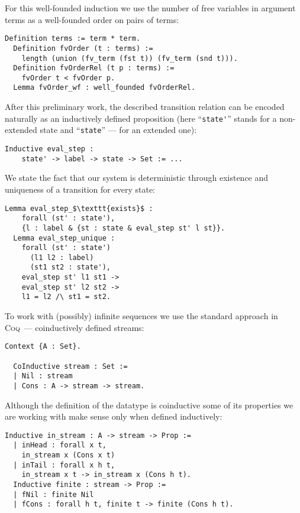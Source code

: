 For this well-founded induction we use the number of free variables in argument terms as a well-founded order on pairs of terms:

\begin{lstlisting}[language=Coq]
  Definition terms := term * term.
  Definition fvOrder (t : terms) :=
    length (union (fv_term (fst t)) (fv_term (snd t))).
  Definition fvOrderRel (t p : terms) :=
    fvOrder t < fvOrder p.
  Lemma fvOrder_wf : well_founded fvOrderRel.
\end{lstlisting}

After this preliminary work, the described transition relation can be encoded naturally as an inductively defined proposition (here ``\lstinline|state'|''
stands for a non-extended state and ``\lstinline|state|'' --- for an extended one):

\begin{lstlisting}[language=Coq]
  Inductive eval_step :
    state' -> label -> state -> Set := ...
\end{lstlisting}

We state the fact that our system is deterministic through existence and uniqueness of a transition for every state:

\begin{lstlisting}[language=Coq]
  Lemma eval_step_$\texttt{exists}$ :
    forall (st' : state'),
    {l : label & {st : state & eval_step st' l st}}.
  Lemma eval_step_unique :
    forall (st' : state')
      (l1 l2 : label)
      (st1 st2 : state'),
    eval_step st' l1 st1 ->
    eval_step st' l2 st2 ->
    l1 = l2 /\ st1 = st2.
\end{lstlisting}

To work with (possibly) infinite sequences we use the standard approach in \textsc{Coq}~--- coinductively defined streams:

\begin{lstlisting}[language=Coq]
  Context {A : Set}.

  CoInductive stream : Set :=
  | Nil : stream
  | Cons : A -> stream -> stream.
\end{lstlisting}

Although the definition of the datatype is coinductive some of its properties we are working with make sense only when defined inductively:

\begin{lstlisting}[language=Coq]
  Inductive in_stream : A -> stream -> Prop :=
  | inHead : forall x t,
    in_stream x (Cons x t)
  | inTail : forall x h t,
    in_stream x t -> in_stream x (Cons h t).
  Inductive finite : stream -> Prop :=
  | fNil : finite Nil
  | fCons : forall h t, finite t -> finite (Cons h t).
\end{lstlisting}

